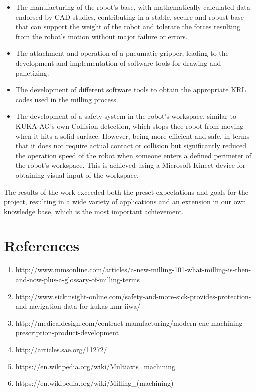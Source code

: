 \documentclass{article}
\begin{document}
\begin{itemize}

	\item The manufacturing of the robot’s base, with mathematically calculated data endorsed by CAD studies, contributing in a stable, secure and robust base that can support the weight of the robot and tolerate the forces resulting from the robot’s motion without major failure or errors.
	\item The attachment and operation of a pneumatic gripper, leading to the development and implementation of software tools for drawing and palletizing.
	\item The development of different software tools to obtain the appropriate KRL codes used in the milling process.
	\item The development of a safety system in the robot’s workspace, similar to KUKA AG’s own Collision detection, which stops thee robot from moving when it hits a solid surface. However, being more efficient and safe, in terms that it does not require actual contact or collision but significantly reduced the operation speed of the robot when someone enters a defined perimeter of the robot’s workspace. This is achieved using a Microsoft Kinect device for obtaining visual input of the workspace.
\end{itemize}

	The results of the work exceeded both the preset expectations and goals for the project, resulting in a wide variety of applications and an extension in our own knowledge base, which is the most important achievement. 
	
	\newpage
	\section{References}
	\begin{enumerate}
		\item http://www.mmsonline.com/articles/a-new-milling-101-what-milling-is-then-and-now-plus-a-glossary-of-milling-terms
		\item http://www.sickinsight-online.com/safety-and-more-sick-provides-protection-and-navigation-data-for-kukas-kmr-iiwa/ 
		\item http://medicaldesign.com/contract-manufacturing/modern-cnc-machining-prescription-product-development 
		\item http://articles.sae.org/11272/ 
		\item https://en.wikipedia.org/wiki/Multiaxis\_machining 
		\item https://en.wikipedia.org/wiki/Milling\_(machining) 	
	\end{enumerate}
	
\end{document}
